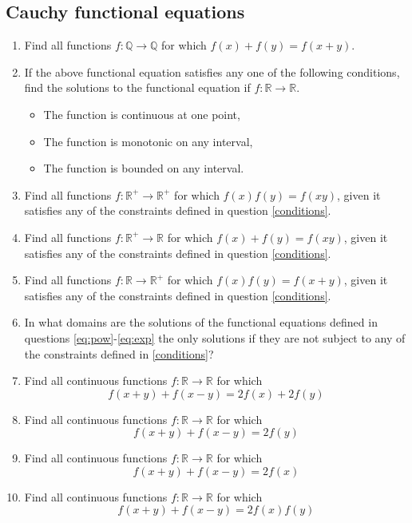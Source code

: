 \documentclass{article}
\begin{document}
	\subsection{Cauchy functional equations} %
		\begin{enumerate}
			\item
			Find all functions $f: \mathbb{Q} \to \mathbb{Q}$ for which $f(x)+f(y)=f(x+y)$.
			\item \label{conditions}
			If the above functional equation satisfies any one of the following conditions, find the solutions to the functional equation if $f: \mathbb{R} \to \mathbb{R}$.
			\begin{itemize}
				\item The function is continuous at one point,
				\item The function is monotonic on any interval,
				\item The function is bounded on any interval.
			\end{itemize}
			\item \label{eq:pow}
			Find all functions $f: \mathbb{R^+} \to \mathbb{R^+}$ for which $f(x)f(y)=f(xy)$, given it satisfies any of the constraints defined in question \ref{conditions}. 
			
			\item \label{eq:log}
			Find all functions $f: \mathbb{R^+} \to \mathbb{R}$ for which $f(x)+f(y)=f(xy)$, given it satisfies any of the constraints defined in question \ref{conditions}.
			
			\item \label{eq:exp}
			Find all functions $f: \mathbb{R} \to \mathbb{R^+}$ for which $f(x)f(y)=f(x+y)$, given it satisfies any of the constraints defined in question \ref{conditions}.
			
			\item  In what domains are the solutions of the functional equations defined in questions \ref{eq:pow}-\ref{eq:exp} the only solutions if they are not subject to any of the constraints defined in \ref{conditions}?
			
			\item Find all continuous functions $f: \mathbb{R} \to \mathbb{R}$ for which
			$$f(x+y) + f(x-y) = 2f(x) + 2f(y) $$
			
			\item Find all continuous functions $f: \mathbb{R} \to \mathbb{R}$ for which
			$$f(x+y) + f(x-y) = 2f(y) $$
			
			\item Find all continuous functions $f: \mathbb{R} \to \mathbb{R}$ for which
			$$f(x+y) + f(x-y) = 2f(x) $$
			
			\item Find all continuous functions $f: \mathbb{R} \to \mathbb{R}$ for which
			$$f(x+y) + f(x-y) = 2f(x) f(y) $$
				
	\end{enumerate}
	
\end{document}
